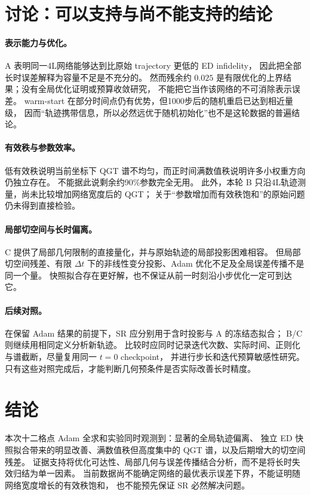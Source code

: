 \documentclass[UTF8,a4paper,11pt,fontset=fandol]{ctexart}
\begin{document}
\section{讨论：可以支持与尚不能支持的结论}
\paragraph{表示能力与优化。}
A 表明同一4L网络能够达到比原始 trajectory 更低的 ED infidelity，
因此把全部长时误差解释为容量不足是不充分的。
然而残余约 $0.025$ 是有限优化的上界结果；没有全局优化证明或预算收敛研究，
不能把它当作该网络的不可消除表示误差。
warm-start 在部分时间点仍有优势，但1000步后的随机重启已达到相近量级，
因而“轨迹携带信息，所以必然远优于随机初始化”也不是这轮数据的普遍结论。

\paragraph{有效秩与参数效率。}
低有效秩说明当前坐标下 QGT 谱不均匀，而正时间满数值秩说明许多小权重方向仍独立存在。
不能据此说剩余约90\%参数完全无用。
此外，本轮 B 只沿4L轨迹测量，尚未比较增加网络宽度后的 QGT；
关于“参数增加而有效秩饱和”的原始问题仍未得到直接检验。

\paragraph{局部切空间与长时偏离。}
C 提供了局部几何限制的直接量化，并与原始轨迹的局部投影困难相容。
但局部切空间残差、有限 $\Delta t$ 下的非线性变分投影、Adam 优化不足及全局误差传播不是同一个量。
快照拟合存在更好解，也不保证从前一时刻沿小步优化一定可到达它。

\paragraph{后续对照。}
在保留 Adam 结果的前提下，SR 应分别用于含时投影与 A 的冻结态拟合；
B/C 则继续用相同定义分析新轨迹。
比较时应同时记录迭代次数、实际时间、正则化与谱截断，尽量复用同一 $t=0$ checkpoint，
并进行步长和迭代预算敏感性研究。只有这些对照完成后，才能判断几何预条件是否实际改善长时精度。

\section{结论}
本次十二格点 Adam 全求和实验同时观测到：显著的全局轨迹偏离、
独立 ED 快照拟合带来的明显改善、满数值秩但高度集中的 QGT 谱，以及后期增大的切空间残差。
证据支持将优化可达性、局部几何与误差传播结合分析，而不是将长时失效归结为单一因素。
当前数据尚不能确定网络的最优表示误差下界，不能证明随网络宽度增长的有效秩饱和，
也不能预先保证 SR 必然解决问题。
\end{document}
